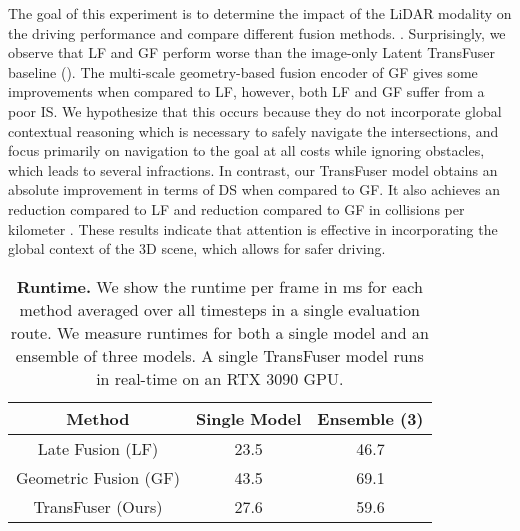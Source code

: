  The goal of this experiment is to determine the impact of the LiDAR modality on the driving performance and compare different fusion methods. .  Surprisingly, we observe that LF and GF perform worse than the image-only Latent TransFuser baseline (). The multi-scale geometry-based fusion encoder of GF gives some improvements when compared to LF, however, both LF and GF suffer from a poor IS. We hypothesize that this occurs because they do not incorporate global contextual reasoning which is necessary to safely navigate the intersections, and focus primarily on navigation to the goal at all costs while ignoring obstacles, which leads to several infractions. In contrast, our TransFuser model obtains an absolute improvement  in terms of DS when compared to GF. It also achieves an  reduction compared to LF and  reduction compared to GF in collisions per kilometer . These results indicate that attention is effective in incorporating the global context of the 3D scene, which allows for safer driving. 

\begin{table}[t]
\small
    \setlength{\tabcolsep}{6pt}
    \centering
    \begin{tabular}{c| c c}
        \textbf{Method} & \textbf{Single Model} & \textbf{Ensemble (3)} \\
        \hline
        Late Fusion (LF) & 23.5 & 46.7 \\
        Geometric Fusion (GF) & 43.5 & 69.1 \\
        TransFuser (Ours) & 27.6 & 59.6 \\
        \hline
    \end{tabular}
    \caption{\textbf{Runtime.} We show the runtime per frame in ms for each method averaged over all timesteps in a single evaluation route. We measure runtimes for both a single model and an ensemble of three models. A single TransFuser model runs in real-time on an RTX 3090 GPU.}
    \label{tab:runtime}
    \vspace{-0.0cm}
\end{table}

